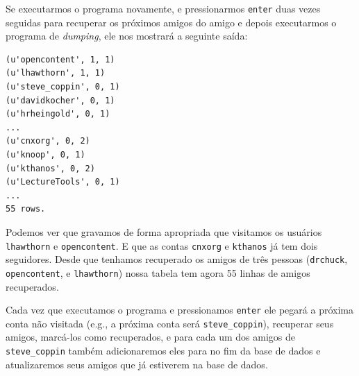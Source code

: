 
Se executarmos o programa novamente, e pressionarmos {\tt enter} duas vezes
seguidas para recuperar os próximos amigos do amigo e depois executarmos o
programa de {\it dumping}, ele nos mostrará a seguinte saída:

\beforeverb
\begin{verbatim}
(u'opencontent', 1, 1)
(u'lhawthorn', 1, 1)
(u'steve_coppin', 0, 1)
(u'davidkocher', 0, 1)
(u'hrheingold', 0, 1)
...
(u'cnxorg', 0, 2)
(u'knoop', 0, 1)
(u'kthanos', 0, 2)
(u'LectureTools', 0, 1)
...
55 rows.
\end{verbatim}
\afterverb
%

Podemos ver que gravamos de forma apropriada que visitamos os usuários
{\tt lhawthorn} e {\tt opencontent}. E que as contas {\tt cnxorg} e
{\tt kthanos} já tem dois seguidores. Desde que tenhamos recuperado os amigos
de três pessoas ({\tt drchuck}, {\tt opencontent}, e {\tt lhawthorn}) nossa
tabela tem agora 55 linhas de amigos recuperados.


Cada vez que executamos o programa e pressionamos {\tt enter} ele pegará a
próxima conta não visitada (e.g., a próxima conta será \verb"steve_coppin"),
recuperar seus amigos, marcá-los como recuperados, e para cada um dos amigos
de \verb"steve_coppin" também adicionaremos eles para no fim da base de dados 
e atualizaremos seus amigos que já estiverem na base de dados.


